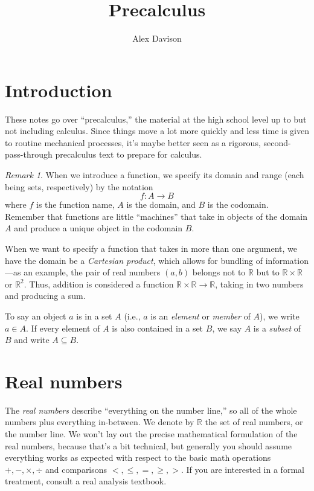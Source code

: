 \documentclass[11pt]{article}
\title{\textbf{Precalculus}}
\author{Alex Davison}
\theoremstyle{definition}
\theoremstyle{remark}
\newtheorem{remark}[thm]{Remark}
\begin{document}
\maketitle

\tableofcontents

\section{Introduction}

These notes go over ``precalculus,'' the material at the high school level up to but not including calculus. Since things move a lot more quickly and less time is given to routine mechanical processes, it's maybe better seen as a rigorous, second-pass-through precalculus text to prepare for calculus.

\begin{remark}
    When we introduce a function, we specify its domain and range (each being sets, respectively) by the notation
    \[
    f : A \to B
    \]
    where $f$ is the function name, $A$ is the domain, and $B$ is the codomain. Remember that functions are little ``machines'' that take in objects of the domain $A$ and produce a unique object in the codomain $B$.

    When we want to specify a function that takes in more than one argument, we have the domain be a \emph{Cartesian product}, which allows for bundling of information---as an example, the pair of real numbers $(a, b)$ belongs not to $\mathbb{R}$ but to $\mathbb{R} \times \mathbb{R}$ or $\mathbb{R}^2$. Thus, addition is considered a function $\mathbb{R} \times \mathbb{R} \to \mathbb{R}$, taking in two numbers and producing a sum.

    To say an object $a$ is in a set $A$ (i.e., $a$ is an \emph{element} or \emph{member} of $A$), we write $a \in A$. If every element of $A$ is also contained in a set $B$, we say $A$ is a \emph{subset} of $B$ and write $A \subseteq B$.
\end{remark}

\section{Real numbers}

The \emph{real numbers} describe ``everything on the number line,'' so all of the whole numbers plus everything in-between. We denote by $\mathbb{R}$ the set of real numbers, or the number line. We won't lay out the precise mathematical formulation of the real numbers, because that's a bit technical, but generally you should assume everything works as expected with respect to the basic math operations $+, -, \times, \div$ and comparisons $<, \leq, =, \geq, >$. If you are interested in a formal treatment, consult a real analysis textbook.
\end{document}
